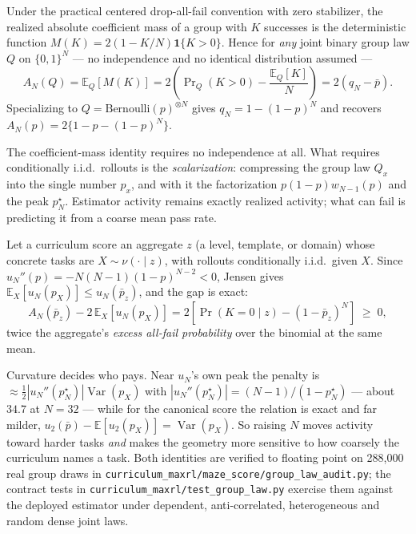 \begin{proposition}
\label{prop:grouplaw}
Under the practical centered drop-all-fail convention with zero stabilizer,
the realized absolute coefficient mass of a group with $K$ successes is the
deterministic function $M(K)=2(1-K/N)\mathbf1\{K>0\}$. Hence for \emph{any}
joint binary group law $Q$ on $\{0,1\}^N$ --- no independence and no identical
distribution assumed ---
\[
A_N(Q)=\mathbb E_Q[M(K)]=2\left(\Pr\nolimits_Q(K>0)-\frac{\mathbb E_Q[K]}{N}\right)
=2(q_N-\bar p).
\]
Specializing to $Q=\mathrm{Bernoulli}(p)^{\otimes N}$ gives $q_N=1-(1-p)^N$
and recovers $A_N(p)=2\{1-p-(1-p)^N\}$.
\end{proposition}
\begin{interp}
The coefficient-mass identity requires no independence at all. What requires
conditionally i.i.d.\ rollouts is the \emph{scalarization}: compressing the
group law $Q_x$ into the single number $p_x$, and with it the factorization
$p(1-p)w_{N-1}(p)$ and the peak $p^\star_N$. Estimator activity remains
exactly realized activity; what can fail is predicting it from a coarse mean
pass rate.
\end{interp}

\begin{corollary}
\label{cor:granularity}
Let a curriculum score an aggregate $z$ (a level, template, or domain) whose
concrete tasks are $X\sim\nu(\cdot\mid z)$, with rollouts conditionally
i.i.d.\ given $X$. Since $u_N''(p)=-N(N-1)(1-p)^{N-2}<0$, Jensen gives
$\mathbb E_X[u_N(p_X)]\le u_N(\bar p_z)$, and the gap is exact:
\[
A_N(\bar p_z)-2\,\mathbb E_X[u_N(p_X)]
=2\left[\Pr(K{=}0\mid z)-(1-\bar p_z)^N\right]\;\ge\;0,
\]
twice the aggregate's \emph{excess all-fail probability} over the binomial at
the same mean.
\end{corollary}
\begin{interp}
Curvature decides who pays. Near $u_N$'s own peak the penalty is
$\approx\tfrac12|u_N''(p^\star_N)|\operatorname{Var}(p_X)$ with
$|u_N''(p^\star_N)|=(N-1)/(1-p^\star_N)$ --- about $34.7$ at $N=32$ --- while
for the canonical score the relation is exact and far milder,
$u_2(\bar p)-\mathbb E[u_2(p_X)]=\operatorname{Var}(p_X)$. So raising $N$ moves
activity toward harder tasks \emph{and} makes the geometry more sensitive to
how coarsely the curriculum names a task. Both identities are verified to
floating point on 288{,}000 real group draws in
\texttt{curriculum\_maxrl/maze\_score/group\_law\_audit.py}; the contract tests
in \texttt{curriculum\_maxrl/test\_group\_law.py} exercise them against the
deployed estimator under dependent, anti-correlated, heterogeneous and random
dense joint laws.
\end{interp}

